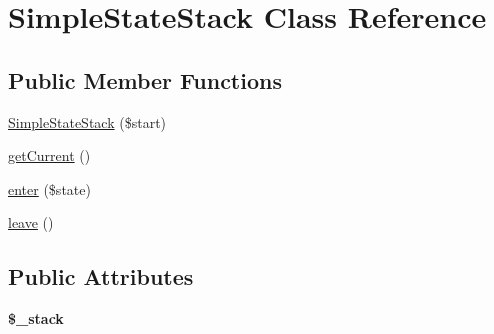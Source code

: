 \hypertarget{class_simple_state_stack}{
\section{SimpleStateStack Class Reference}
\label{class_simple_state_stack}
}
\subsection*{Public Member Functions}
\begin{DoxyCompactItemize}
\item 
\hyperlink{class_simple_state_stack_a223dbdb698b604ae03f8cd7e330ec637}{SimpleStateStack} (\$start)
\item 
\hyperlink{class_simple_state_stack_a458c1edc7ee2628b74fb73a207952462}{getCurrent} ()
\item 
\hyperlink{class_simple_state_stack_afea48ccdd072d556d9bd7eb9641e35bb}{enter} (\$state)
\item 
\hyperlink{class_simple_state_stack_a135b1517ac49eb6bdbcecf009c86a077}{leave} ()
\end{DoxyCompactItemize}
\subsection*{Public Attributes}
\begin{DoxyCompactItemize}
\item 
\hypertarget{class_simple_state_stack_a645b877e827b9bb8a46d892dc723997e}{
{\bfseries \$\_\-stack}}
\label{class_simple_state_stack_a645b877e827b9bb8a46d892dc723997e}

\end{DoxyCompactItemize}


